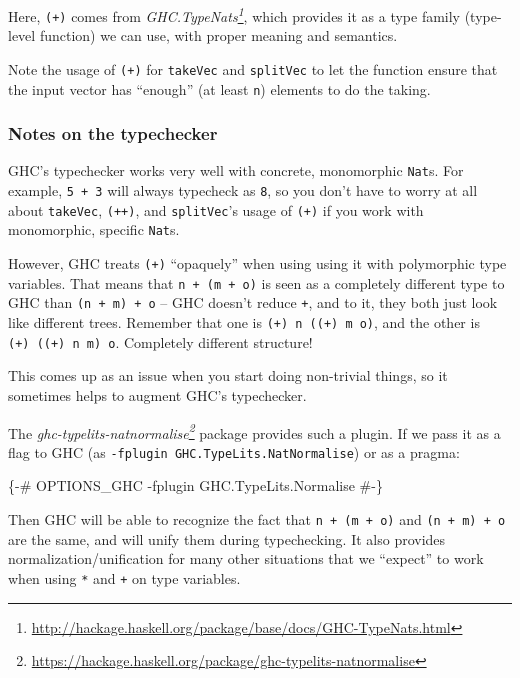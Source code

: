 \documentclass[]{article}
\newenvironment{Shaded}{}{}
\newcommand{\OtherTok}[1]{\textcolor[rgb]{0.00,0.44,0.13}{#1}}
\renewcommand{\href}[2]{#2\footnote{\url{#1}}}
\begin{document}
Here, \texttt{(+)} comes from
\emph{\href{http://hackage.haskell.org/package/base/docs/GHC-TypeNats.html}{GHC.TypeNats}},
which provides it as a type family (type-level function) we can use, with proper
meaning and semantics.

Note the usage of \texttt{(+)} for \texttt{takeVec} and \texttt{splitVec} to let
the function ensure that the input vector has ``enough'' (at least \texttt{n})
elements to do the taking.

\subsubsection{Notes on the typechecker}\label{notes-on-the-typechecker}

GHC's typechecker works very well with concrete, monomorphic \texttt{Nat}s. For
example, \texttt{5\ +\ 3} will always typecheck as \texttt{8}, so you don't have
to worry at all about \texttt{takeVec}, \texttt{(++)}, and \texttt{splitVec}'s
usage of \texttt{(+)} if you work with monomorphic, specific \texttt{Nat}s.

However, GHC treats \texttt{(+)} ``opaquely'' when using using it with
polymorphic type variables. That means that \texttt{n\ +\ (m\ +\ o)} is seen as
a completely different type to GHC than \texttt{(n\ +\ m)\ +\ o} -- GHC doesn't
reduce \texttt{+}, and to it, they both just look like different trees. Remember
that one is \texttt{(+)\ n\ ((+)\ m\ o)}, and the other is
\texttt{(+)\ ((+)\ n\ m)\ o}. Completely different structure!

This comes up as an issue when you start doing non-trivial things, so it
sometimes helps to augment GHC's typechecker.

The
\emph{\href{https://hackage.haskell.org/package/ghc-typelits-natnormalise}{ghc-typelits-natnormalise}}
package provides such a plugin. If we pass it as a flag to GHC (as
\texttt{-fplugin\ GHC.TypeLits.NatNormalise}) or as a pragma:

\begin{Shaded}
\begin{Highlighting}[]
\OtherTok{\{-# OPTIONS_GHC -fplugin GHC.TypeLits.Normalise #-\}}
\end{Highlighting}
\end{Shaded}

Then GHC will be able to recognize the fact that \texttt{n\ +\ (m\ +\ o)} and
\texttt{(n\ +\ m)\ +\ o} are the same, and will unify them during typechecking.
It also provides normalization/unification for many other situations that we
``expect'' to work when using \texttt{*} and \texttt{+} on type variables.
\end{document}
